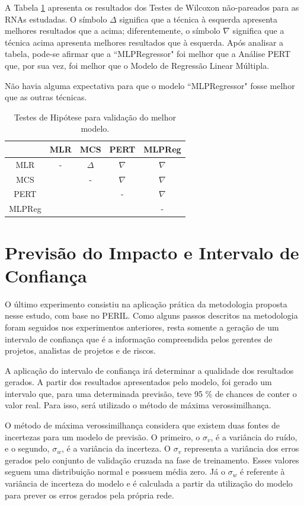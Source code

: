 A Tabela \ref{tab:teste_hipotese} apresenta os resultados dos Testes de Wilcoxon não-pareados para as RNAs estudadas. O símbolo $\Delta$ significa que a técnica à esquerda apresenta melhores resultados que a acima; diferentemente, o símbolo $\nabla$ significa que a técnica acima apresenta melhores resultados que à esquerda. Após analisar a tabela, pode-se afirmar que a ``MLPRegressor" foi melhor que a Análise PERT que, por sua vez, foi melhor que o Modelo de Regressão Linear Múltipla.

Não havia alguma expectativa para que o modelo ``MLPRegressor" fosse melhor que as outras técnicas.

\begin{table}[h]
\caption{Testes de Hipótese para validação do melhor modelo.}\label{tab:teste_hipotese} \centering
\begin{tabular}{|c|c|c|c|c|}
  \hline
   & MLR & MCS & PERT & MLPReg  \\
  \hline
  MLR & - & $\Delta$ & $\nabla$ & $\nabla$   \\
  \hline
  MCS &  & - & $\nabla$ & $\nabla$   \\
  \hline
  PERT &  &  & - & $\nabla$   \\
  \hline
  MLPReg & & &  & -   \\
  \hline
\end{tabular}
\end{table}

\section{Previsão do Impacto e Intervalo de Confiança}

O último experimento consistiu na aplicação prática da metodologia proposta nesse estudo, com base no PERIL. Como alguns passos descritos na metodologia foram seguidos nos experimentos anteriores, resta somente a geração de um intervalo de confiança que é a informação compreendida pelos gerentes de projetos, analistas de projetos e de riscos.

A aplicação do intervalo de confiança irá determinar a qualidade dos resultados gerados. A partir dos resultados apresentados pelo modelo, foi gerado um intervalo que, para uma determinada previsão, teve 95 \% de chances de conter o valor real. Para isso, será utilizado o método de máxima verossimilhança.

O método de máxima verossimilhança considera que existem duas fontes de incertezas para um modelo de previsão. O primeiro, o $\sigma_v$, é a variância do ruído, e o segundo, $\sigma_w$, é a variância da incerteza. O $\sigma_v$ representa a variância dos erros gerados pelo conjunto de validação cruzada na fase de treinamento. Esses valores seguem uma distribuição normal e possuem média zero. Já o $\sigma_w$ é referente à variância de incerteza do modelo e é calculada a partir da utilização do modelo para prever os erros gerados pela própria rede.

